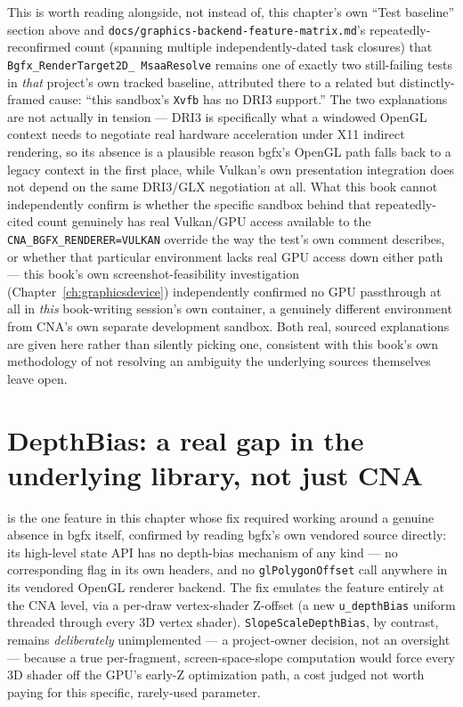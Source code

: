 This is worth reading alongside, not instead of, this chapter's own ``Test baseline'' section
above and \texttt{docs/graphics-backend-feature-matrix.md}'s repeatedly-reconfirmed count
(spanning multiple independently-dated task closures) that \texttt{Bgfx\_RenderTarget2D\_%
MsaaResolve} remains one of exactly two still-failing tests in \emph{that} project's own
tracked baseline, attributed there to a related but distinctly-framed cause: ``this sandbox's
\texttt{Xvfb} has no DRI3 support.'' The two explanations are not actually in tension --- DRI3
is specifically what a windowed OpenGL context needs to negotiate real hardware acceleration
under X11 indirect rendering, so its absence is a plausible reason bgfx's OpenGL path falls
back to a legacy context in the first place, while Vulkan's own presentation integration does
not depend on the same DRI3/GLX negotiation at all. What this book cannot independently confirm
is whether the specific sandbox behind that repeatedly-cited count genuinely has real Vulkan/GPU
access available to the \texttt{CNA\_BGFX\_RENDERER=VULKAN} override the way the test's own
comment describes, or whether that particular environment lacks real GPU access down either
path --- this book's own screenshot-feasibility investigation (Chapter~\ref{ch:graphicsdevice})
independently confirmed no GPU passthrough at all in \emph{this} book-writing session's own
container, a genuinely different environment from CNA's own separate development sandbox. Both
real, sourced explanations are given here rather than silently picking one, consistent with
this book's own methodology of not resolving an ambiguity the underlying sources themselves
leave open.

\section{DepthBias: a real gap in the underlying library, not just CNA}

 is the one feature in this chapter whose fix required
working around a genuine absence in bgfx itself, confirmed by reading bgfx's own vendored
source directly: its high-level state API has no depth-bias mechanism of any kind --- no
corresponding flag in its own headers, and no \texttt{glPolygonOffset} call anywhere in its
vendored OpenGL renderer backend. The fix emulates the feature entirely at the CNA level, via
a per-draw vertex-shader Z-offset (a new \texttt{u\_depthBias} uniform threaded through every
3D vertex shader). \texttt{SlopeScaleDepthBias}, by contrast, remains \emph{deliberately}
unimplemented --- a project-owner decision, not an oversight --- because a true
per-fragment, screen-space-slope computation would force every 3D shader off the GPU's
early-Z optimization path, a cost judged not worth paying for this specific, rarely-used
parameter.

